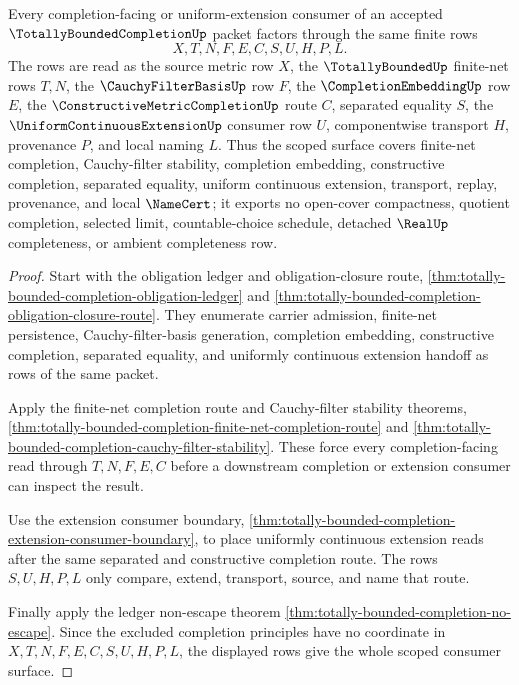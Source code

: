 \begin{theorem}
\label{thm:totally-bounded-completion-scoped-consumer-coverage}
Every completion-facing or uniform-extension consumer of an accepted $\TotallyBoundedCompletionUp$ packet factors through the same finite rows
$$
X,T,N,F,E,C,S,U,H,P,L .
$$
The rows are read as the source metric row $X$, the $\TotallyBoundedUp$ finite-net rows $T,N$, the $\CauchyFilterBasisUp$ row $F$, the $\CompletionEmbeddingUp$ row $E$, the $\ConstructiveMetricCompletionUp$ route $C$, separated equality $S$, the $\UniformContinuousExtensionUp$ consumer row $U$, componentwise transport $H$, provenance $P$, and local naming $L$. Thus the scoped surface covers finite-net completion, Cauchy-filter stability, completion embedding, constructive completion, separated equality, uniform continuous extension, transport, replay, provenance, and local $\NameCert$; it exports no open-cover compactness, quotient completion, selected limit, countable-choice schedule, detached $\RealUp$ completeness, or ambient completeness row.
\end{theorem}
\begin{proof}
Start with the obligation ledger and obligation-closure route, \autoref{thm:totally-bounded-completion-obligation-ledger} and \autoref{thm:totally-bounded-completion-obligation-closure-route}. They enumerate carrier admission, finite-net persistence, Cauchy-filter-basis generation, completion embedding, constructive completion, separated equality, and uniformly continuous extension handoff as rows of the same packet.

Apply the finite-net completion route and Cauchy-filter stability theorems, \autoref{thm:totally-bounded-completion-finite-net-completion-route} and \autoref{thm:totally-bounded-completion-cauchy-filter-stability}. These force every completion-facing read through $T,N,F,E,C$ before a downstream completion or extension consumer can inspect the result.

Use the extension consumer boundary, \autoref{thm:totally-bounded-completion-extension-consumer-boundary}, to place uniformly continuous extension reads after the same separated and constructive completion route. The rows $S,U,H,P,L$ only compare, extend, transport, source, and name that route.

Finally apply the ledger non-escape theorem \autoref{thm:totally-bounded-completion-no-escape}. Since the excluded completion principles have no coordinate in $X,T,N,F,E,C,S,U,H,P,L$, the displayed rows give the whole scoped consumer surface.
\end{proof}

